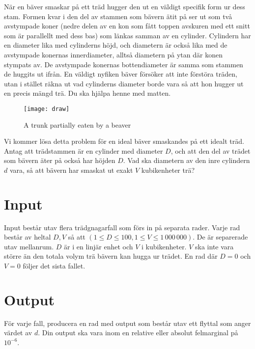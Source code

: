 
När en bäver smaskar på ett träd hugger den ut en väldigt specifik form ur dess stam. Formen kvar i 
den del av stammen som bävern ätit på ser ut som två avstympade koner (nedre delen av en kon som 
fått toppen avskuren med ett snitt som är parallellt med dess bas) som länkas samman av en cylinder.
Cylindern har en diameter lika med cylinderns höjd, och diametern är också lika med de avstympade
konernas innerdiameter, alltså diametern på ytan där konen stympats av. De avstympade konernas
bottendiameter är samma som stammen de huggits ut ifrån. %
En väldigt nyfiken bäver försöker att inte förstöra träden, utan i stället räkna ut vad cylinderns
diameter borde vara så att hon hugger ut en precis mängd trä. Du ska hjälpa henne med matten.

\begin{figure}[h]
  \begin{center}
    \texttt{[image: draw]}
  \end{center}
  \caption{A trunk partially eaten by a beaver}
  \label{fig:example}
\end{figure}

Vi kommer lösa detta problem för en ideal bäver smaskandes på ett idealt träd. Antag att trädstammen
är en cylinder med diameter $D$, och att den del av trädet som bävern äter på också har höjden $D$.
Vad ska diametern av den inre cylindern $d$ vara, så att bävern har smaskat ut exakt $V$ kubikenheter
trä?

\section*{Input}
Input består utav flera trädgnagarfall som förs in på separata rader. Varje rad består av heltal
$D, V$ så att $(1\leq D\leq 100, 1\leq V\leq 1\,000\,000)$. De är separerade utav mellanrum. $D$
är i en linjär enhet och $V$ i kubikenheter. $V$ ska inte vara större än den totala volym trä
bävern kan hugga ur trädet. En rad där $D=0$ och $V=0$ följer det sista fallet.

\section*{Output}
För varje fall, producera en rad med output som består utav ett flyttal som anger värdet av $d$.
Din output ska vara inom en relative eller absolut felmarginal på $10^{-6}$.
